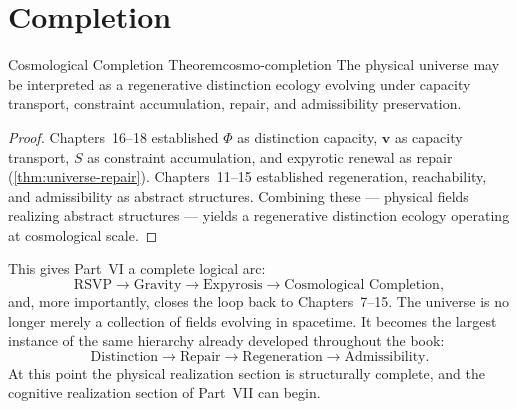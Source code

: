 \documentclass[12pt,twoside,openright]{book}
\begin{document}
\section{Completion}
\label{sec:ch19-completion}

\begin{theorem}{Cosmological Completion Theorem}{cosmo-completion}
  The physical universe may be interpreted as a
  regenerative distinction ecology evolving under capacity
  transport, constraint accumulation, repair, and
  admissibility preservation.
\end{theorem}

\begin{proof}
  Chapters~16--18 established $\Phi$ as distinction
  capacity, $\mathbf{v}$ as capacity transport, $S$ as
  constraint accumulation, and expyrotic renewal as repair
  (\cref{thm:universe-repair}). Chapters~11--15 established
  regeneration, reachability, and admissibility as abstract
  structures. Combining these — physical fields realizing
  abstract structures — yields a regenerative distinction
  ecology operating at cosmological scale.
\end{proof}

This gives Part~VI a complete logical arc:
\[
  \text{RSVP} \to \text{Gravity} \to \text{Expyrosis}
  \to \text{Cosmological Completion},
\]
and, more importantly, closes the loop back to
Chapters~7--15. The universe is no longer merely a
collection of fields evolving in spacetime. It becomes the
largest instance of the same hierarchy already developed
throughout the book:
\[
  \text{Distinction} \to \text{Repair} \to \text{Regeneration}
  \to \text{Admissibility}.
\]
At this point the physical realization section is
structurally complete, and the cognitive realization
section of Part~VII can begin.
\end{document}
